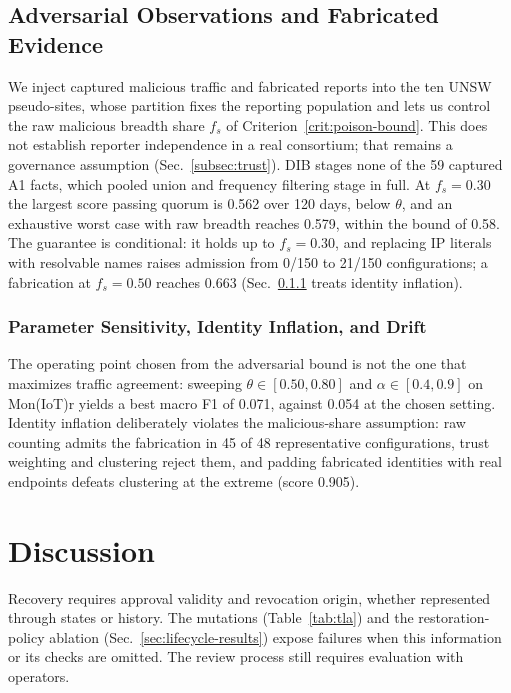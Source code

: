 \documentclass[journal]{IEEEtran}
\theoremstyle{definition}
\begin{document}
\subsection{Adversarial Observations and Fabricated Evidence}
\label{sec:security-results}
We inject captured malicious traffic and fabricated reports into the ten UNSW pseudo-sites, whose partition fixes the reporting population and lets us control the raw malicious breadth share $f_s$ of Criterion~\ref{crit:poison-bound}. This does not establish reporter independence in a real consortium; that remains a governance assumption (Sec.~\ref{subsec:trust}). DIB stages none of the 59 captured A1 facts, which pooled union and frequency filtering stage in full. At $f_s=0.30$ the largest score passing quorum is 0.562 over 120 days, below $\theta$, and an exhaustive worst case with raw breadth reaches 0.579, within the bound of 0.58. The guarantee is conditional: it holds up to $f_s=0.30$, and replacing IP literals with resolvable names raises admission from 0/150 to 21/150 configurations; a fabrication at $f_s=0.50$ reaches 0.663 (Sec.~\ref{sec:sensitivity-results} treats identity inflation). \subsubsection{Parameter Sensitivity, Identity Inflation, and Drift}
\label{sec:sensitivity-results}
The operating point chosen from the adversarial bound is not the one that maximizes traffic agreement: sweeping $\theta\in[0.50,0.80]$ and $\alpha\in[0.4,0.9]$ on Mon(IoT)r yields a best macro F1 of 0.071, against 0.054 at the chosen setting. Identity inflation deliberately violates the malicious-share assumption: raw counting admits the fabrication in 45 of 48 representative configurations, trust weighting and clustering reject them, and padding fabricated identities with real endpoints defeats clustering at the extreme (score 0.905).

\section{Discussion}
\label{sec:discussion}

Recovery requires approval validity and revocation origin, whether represented through states or history. The mutations (Table~\ref{tab:tla}) and the restoration-policy ablation (Sec.~\ref{sec:lifecycle-results}) expose failures when this information or its checks are omitted. The review process still requires evaluation with operators.
\end{document}
